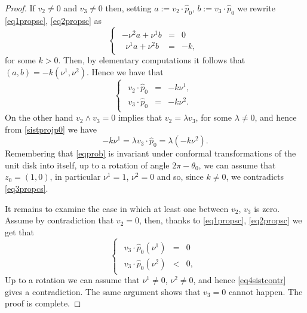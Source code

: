 \documentclass[a4paper,reqno,10pt,oneside]{amsart}
\numberwithin{equation}{section}
\begin{document}
\begin{proof}
If $v_2 \neq 0$ and $v_3 \neq 0$ then, setting $a:=v_2 \cdot \hat p_0$, $b:=v_3 \cdot \hat p_0$ we rewrite \eqref{eq1propsc}, \eqref{eq2propsc} as
\begin{equation*}
\begin{cases}
\begin{array}{lll}
\displaystyle  -\nu^2 a +  \nu^1 b &=& \displaystyle0\\
\displaystyle \ \ \nu^1 a +  \nu^2 b &=& \displaystyle -k,
\end{array}
\end{cases}
\end{equation*}
for some $k>0$. Then, by elementary computations it follows that $(a,b)= - k (\nu^1,\nu^2).$ Hence we have that
\begin{equation}\label{sistprojp0}
\begin{cases}
\begin{array}{lll}
\displaystyle  v_2 \cdot \hat p_0 &=& - k \nu^1,\\
\displaystyle  v_3 \cdot \hat p_0 &=& - k \nu^2.
\end{array}
\end{cases}
\end{equation}
On the other hand $v_2 \wedge v_3 =0$ implies that $v_2=\lambda v_3$, for some $\lambda \neq 0$, and hence from \eqref{sistprojp0} we have
\begin{equation}\label{eq3propcs}
 -k \nu^1 = \lambda v_3 \cdot \hat p_0 = \lambda (- k \nu^2).
\end{equation}
Remembering that \eqref{eqprob} is invariant under conformal transformations of the unit disk into itself, up to a rotation of angle $2\pi - \theta_0$, we can assume that $z_0=(1,0)$, in particular $\nu^1=1$, $\nu^2=0$ and so, since $k\neq 0$, we contradicts \eqref{eq3propcs}.

It remains to examine the case in which at least one between $v_2$, $v_3$ is zero. Assume by contradiction that $v_2=0$, then, thanks to \eqref{eq1propsc}, \eqref{eq2propsc} we get that
\begin{equation}\label{eq4sistcontr}
\begin{cases}
\begin{array}{lll}
\displaystyle   v_3\cdot \hat p_0 (\nu^1) &=& 0\\
\displaystyle  v_3\cdot \hat p_0 (\nu^2) &<& 0,
\end{array}
\end{cases}
\end{equation}
Up to a rotation we can assume that $\nu^1\neq 0$, $\nu^2\neq 0$, and hence \eqref{eq4sistcontr} gives a contradiction. The same argument shows that $v_3=0$ cannot happen. The proof is complete.
\end{proof}
\end{document}
